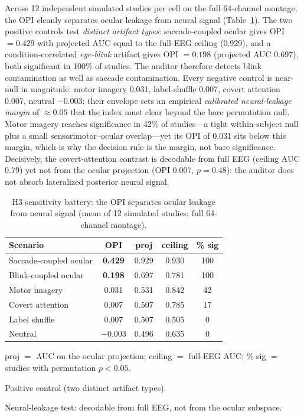 \documentclass[conference]{IEEEtran}
\begin{document}
Across 12 independent simulated studies per cell on the full 64-channel montage, the OPI cleanly
separates ocular leakage from neural signal (Table~\ref{tab:battery}).
The two positive controls test \emph{distinct artifact types}: saccade-coupled ocular gives
OPI $=0.429$ with projected AUC equal to the full-EEG ceiling (0.929), and a condition-correlated
\emph{eye-blink} artifact gives OPI $=0.198$ (projected AUC 0.697), both significant in 100\% of
studies. The auditor therefore detects blink contamination as well as saccade contamination.
Every negative control is near-null in magnitude: motor imagery 0.031, label-shuffle 0.007,
covert attention 0.007, neutral $-0.003$; their envelope sets an empirical \emph{calibrated
neural-leakage margin} of $\approx 0.05$ that the index must clear beyond the bare permutation
null. Motor imagery reaches significance in 42\% of studies---a tight within-subject null plus a
small sensorimotor--ocular overlap---yet its OPI of 0.031 sits below this margin, which is why
the decision rule is the margin, not bare significance. Decisively, the covert-attention contrast is decodable from full EEG (ceiling AUC 0.79)
yet not from the ocular projection (OPI 0.007, $p=0.48$): the auditor does not absorb lateralized
posterior neural signal.

\begin{table}[!t]
\centering
\caption{H3 sensitivity battery: the OPI separates ocular leakage from neural signal (mean of
12 simulated studies; full 64-channel montage).}\label{tab:battery}
\begin{threeparttable}
{\small
\begin{tabular*}{\columnwidth}{@{\extracolsep{\fill}} l cccc @{}}
\toprule
\textbf{Scenario} & \textbf{OPI} & \textbf{proj} & \textbf{ceiling} & \textbf{\% sig} \\
\midrule
Saccade-coupled ocular\tnote{a} & \textbf{0.429} & 0.929 & 0.930 & 100 \\
Blink-coupled ocular\tnote{a}   & \textbf{0.198} & 0.697 & 0.781 & 100 \\
Motor imagery          & 0.031 & 0.531 & 0.842 & 42 \\
Covert attention\tnote{b} & 0.007 & 0.507 & 0.785 & 17 \\
Label shuffle          & 0.007 & 0.507 & 0.505 & 0 \\
Neutral                & $-$0.003 & 0.496 & 0.635 & 0 \\
\bottomrule
\end{tabular*}}
\begin{tablenotes}
\small
\item proj $=$ AUC on the ocular projection; ceiling $=$ full-EEG AUC; \% sig $=$ studies with
permutation $p<0.05$.
\item[a] Positive control (two distinct artifact types). \item[b] Neural-leakage test:
decodable from full EEG, not from the ocular subspace.
\end{tablenotes}
\end{threeparttable}
\end{table}
\end{document}
